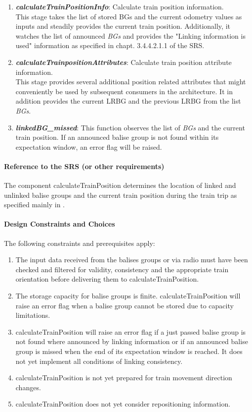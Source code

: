 \begin{enumerate}
\item \textbf{\textit{calculateTrainPositionInfo}}: Calculate train position information.\\
This stage takes the list of stored BGs and the current odometry values as inputs and steadily provides the current train position. Additionally, it watches the list of announced \textit{BGs} and provides the "Linking information is used" information as specified in chapt. 3.4.4.2.1.1 of the SRS. 

\item \textbf{\textit{calculateTrainpositionAttributes}}: Calculate train position attribute information.\\
This stage provides several additional position related attributes that might conveniently be used by subsequent consumers in the architecture. It in addition provides the current LRBG and the previous LRBG from the list \textit{BGs}. 

\item \textbf{\textit{linkedBG\_missed}}: This function observes the list of \textit{BGs} and the current train position. If an announced balise group is not found within its expectation window, an error flag will be raised. 

\end{enumerate}


\paragraph{Reference to the SRS (or other requirements)}
The component calculateTrainPosition determines the location of linked and unlinked balise groups and the current train position during the train trip as specified mainly in \cite[Chapter~3.6]{subset-026}.

\paragraph{Design Constraints and Choices}
The following constraints and prerequisites apply:
\begin{enumerate}
\item The input data received from the balises groups or via radio must have been checked and filtered for validity, consistency and the appropriate train orientation before delivering them to calculateTrainPosition. 
\item The storage capacity for balise groups is finite. calculateTrainPosition will raise an error flag when a balise group cannot be stored due to capacity limitations.
\item calculateTrainPosition will raise an error flag if a just passed balise group is not found where announced by linking information or if an announced balise group is missed when the end of its expectation window is reached. It does not yet implement all conditions of linking consistency.
\item calculateTrainPosition is not yet prepared for train movement direction changes. 
\item calculateTrainPosition does not yet consider repositioning information.
\end{enumerate}



